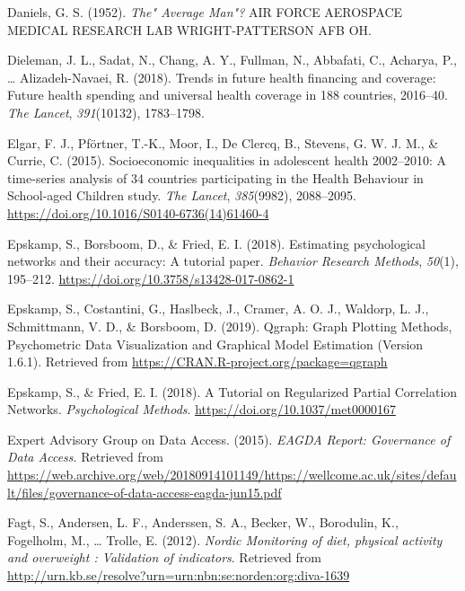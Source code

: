 \documentclass[british,man]{apa6}
\begin{document}
\leavevmode\hypertarget{ref-danielsAverageMan1952}{}%
Daniels, G. S. (1952). \emph{The" Average Man"?} AIR FORCE AEROSPACE MEDICAL RESEARCH LAB WRIGHT-PATTERSON AFB OH.

\leavevmode\hypertarget{ref-dielemanTrendsFutureHealth2018}{}%
Dieleman, J. L., Sadat, N., Chang, A. Y., Fullman, N., Abbafati, C., Acharya, P., \ldots{} Alizadeh-Navaei, R. (2018). Trends in future health financing and coverage: Future health spending and universal health coverage in 188 countries, 2016--40. \emph{The Lancet}, \emph{391}(10132), 1783--1798.

\leavevmode\hypertarget{ref-elgarSocioeconomicInequalitiesAdolescent2015}{}%
Elgar, F. J., Pförtner, T.-K., Moor, I., De Clercq, B., Stevens, G. W. J. M., \& Currie, C. (2015). Socioeconomic inequalities in adolescent health 2002--2010: A time-series analysis of 34 countries participating in the Health Behaviour in School-aged Children study. \emph{The Lancet}, \emph{385}(9982), 2088--2095. \url{https://doi.org/10.1016/S0140-6736(14)61460-4}

\leavevmode\hypertarget{ref-epskampEstimatingPsychologicalNetworks2018}{}%
Epskamp, S., Borsboom, D., \& Fried, E. I. (2018). Estimating psychological networks and their accuracy: A tutorial paper. \emph{Behavior Research Methods}, \emph{50}(1), 195--212. \url{https://doi.org/10.3758/s13428-017-0862-1}

\leavevmode\hypertarget{ref-epskampQgraphGraphPlotting2019}{}%
Epskamp, S., Costantini, G., Haslbeck, J., Cramer, A. O. J., Waldorp, L. J., Schmittmann, V. D., \& Borsboom, D. (2019). Qgraph: Graph Plotting Methods, Psychometric Data Visualization and Graphical Model Estimation (Version 1.6.1). Retrieved from \url{https://CRAN.R-project.org/package=qgraph}

\leavevmode\hypertarget{ref-epskampTutorialRegularizedPartial2018}{}%
Epskamp, S., \& Fried, E. I. (2018). A Tutorial on Regularized Partial Correlation Networks. \emph{Psychological Methods}. \url{https://doi.org/10.1037/met0000167}

\leavevmode\hypertarget{ref-expertadvisorygroupondataaccessEAGDAReportGovernance2015}{}%
Expert Advisory Group on Data Access. (2015). \emph{EAGDA Report: Governance of Data Access}. Retrieved from \url{https://web.archive.org/web/20180914101149/https://wellcome.ac.uk/sites/default/files/governance-of-data-access-eagda-jun15.pdf}

\leavevmode\hypertarget{ref-fagtNordicMonitoringDiet2012}{}%
Fagt, S., Andersen, L. F., Anderssen, S. A., Becker, W., Borodulin, K., Fogelholm, M., \ldots{} Trolle, E. (2012). \emph{Nordic Monitoring of diet, physical activity and overweight : Validation of indicators}. Retrieved from \url{http://urn.kb.se/resolve?urn=urn:nbn:se:norden:org:diva-1639}
\end{document}
